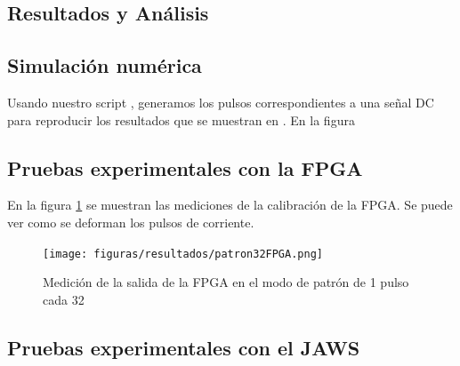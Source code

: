 \documentclass[twoside]{article}
\begin{document}
\begin{multicols}{2}
\section{Resultados y Análisis}

    \subsection{Simulación numérica}

    Usando nuestro script \cite{script}, generamos los pulsos correspondientes a una señal DC para reproducir los resultados que se muestran en \cite{aziz1996}. En la figura 

    \subsection{Pruebas experimentales con la FPGA}

    En la figura \ref{fig:resultados_patron32FPGA} se muestran las mediciones de la calibración de la FPGA. Se puede ver como se deforman los pulsos de corriente.

    \begin{figure}[H]
        \centering
        \texttt{[image: figuras/resultados/patron32FPGA.png]}
        \caption{Medición de la salida de la FPGA en el modo de patrón de 1 pulso cada 32}
        \label{fig:resultados_patron32FPGA}
    \end{figure}

    \subsection{Pruebas experimentales con el JAWS}



\end{multicols}





\nocite{*} %
\end{document}
